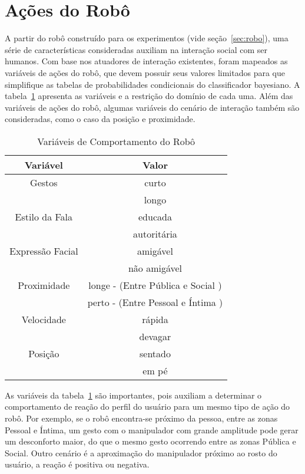\section{Ações do Robô}
\label{sec:comportamento-robo}
A partir do robô construído para os experimentos (vide seção~\ref{sec:robo}), uma série de características consideradas auxiliam na interação social com ser humanos. Com base nos atuadores de interação existentes, foram mapeados as variáveis de ações do robô, que devem possuir seus valores limitados para que simplifique as tabelas de probabilidades condicionais do classificador bayesiano. A tabela~\ref{tab:variaveisvalores} apresenta as variáveis e a restrição do domínio de cada uma. Além das variáveis de ações do robô, algumas variáveis do cenário de interação também são consideradas, como o caso da posição e proximidade.

\begin{table}[!ht]
	\caption{Variáveis de Comportamento do Robô}
	\label{tab:variaveisvalores}
	\centering
	\begin{tabular}{c | c}
		\hline
		Variável & Valor \\
		\hline
		Gestos & curto \\
		& longo \\
		\hline
		Estilo da Fala & educada \\
		& autoritária \\
		\hline
		Expressão Facial & amigável \\
		& não amigável \\
		\hline
		Proximidade & longe - (Entre Pública e Social ) \\
		& perto - (Entre Pessoal e Íntima ) \\
		\hline
		Velocidade & rápida \\
		& devagar \\
		\hline
		Posição & sentado \\
		& em pé \\
		\hline
	\end{tabular}
\end{table}

As variáveis da tabela~\ref{tab:variaveisvalores} são importantes, pois auxiliam a determinar o comportamento de reação do perfil do usuário para um mesmo tipo de ação do robô. Por exemplo, se o robô encontra-se próximo da pessoa, entre as zonas Pessoal e Íntima, um gesto com o manipulador com grande amplitude pode gerar um desconforto maior, do que o mesmo gesto ocorrendo entre as zonas Pública e Social. Outro cenário é a aproximação do manipulador próximo ao rosto do usuário, a reação é positiva ou negativa.

